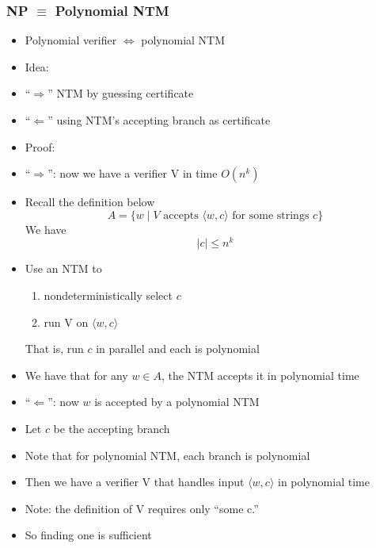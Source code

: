\begin{frame}[allowframebreaks] \frametitle{NP $\equiv$ Polynomial NTM}

  \begin{itemize}
\item Polynomial verifier $\Leftrightarrow$ polynomial NTM

\item Idea:

\item [] ``$\Rightarrow$'' NTM by guessing certificate

\item [] ``$\Leftarrow$'' using NTM's accepting branch as  certificate
\item Proof:
\item ``$\Rightarrow$'': now we have a verifier V in time $O(n^k)$

  
\item [] Recall the definition below
    \begin{equation*}
    A=\{w\mid
V \mbox{ accepts } 
\langle  w,c\rangle  
\mbox{ for some strings } c\}
  \end{equation*}
We have
\begin{equation*}
|c|\leq n^k
\end{equation*}
\item Use an NTM to
  \begin{enumerate}
  \item nondeterministically select $c$
  \item run V on $\langle  w,c\rangle $
  \end{enumerate}
That is, run $c$ in parallel and each is polynomial
\item We have that for any $w \in A$, the NTM accepts
  it in polynomial time
\item ``$\Leftarrow$'': now $w$ is accepted by a polynomial NTM
\item [] Let $c$ be the accepting branch
\item [] Note that for polynomial NTM, each branch is polynomial
\item Then we have a verifier V that handles input $\langle  w,c\rangle $
in polynomial time

\item Note: the definition of V requires only ``some c.''
\item So finding one is sufficient

\end{itemize}\end{frame}

